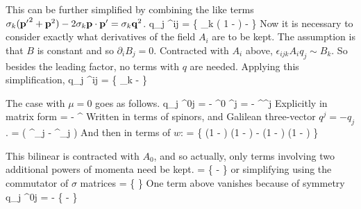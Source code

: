 This can be further simplified by combining the like terms $\sigma_k (\mathbf{p'}^2 + \mathbf{p}^2 ) - 2 \sigma_k \mathbf{p} \cdot \mathbf{p'} = \sigma_k \mathbf{q}^2$.
\beq
	\srb  {} q_j \sigma^{ij} \sr 
		=  \wxd \left \{
			\sigma_k \left( 1 -  \right ) -  
		\right \} \wx
\eeq
Now it is necessary to consider exactly what derivatives of the field $A_i$ are to be kept.  The assumption is that $B$ is constant and so $\partial_i B_j = 0$.  Contracted with $A_i$ above, $\epsilon_{ijk} A_i q_j \sim B_k$.  So besides the leading factor, no terms with $q$ are needed.  Applying this simplification,
\beq \label{eq:Sh:Ti}
	\srb  {} q_j \sigma^{ij} \sr 
		=  \wxd \left \{
			\sigma_k -  
		\right \} \wx
\eeq






The case with $\mu=0$ goes as follows.
\beq
	\srb  {} q_j \sigma^{0j} \sr
		=	 -  \srb \gamma^0 \gamma^j \sr 		
 		=  -  \sr^\dagger \gamma^j \sr
\eeq
Explicitly in matrix form 
\beq
	 = -  \sr^\dagger {} \sr 
\eeq
 Written in terms of spinors, and Galilean three-vector $q^j= -q_j$.
 \beq
 	=   \left( \eta^\dagger \sigma_j \chi - \chi^\dagger \sigma_j \eta \right )
 \eeq
 And then in terms of $w$:
\beq
	=    \wxd \left \{
		\left(1 -  \right )   \left(1 -  \right )
		- \left(1 -  \right )  \left(1 -  \right )
	\right \} \wx
\eeq

This bilinear is contracted with $A_0$, and so actually, only terms involving two additional powers of momenta need be kept.
\beq
	=    \wxd \left \{
		-   
	\right \} \wx
\eeq
or simplifying using the commutator of $\sigma$ matrices
\beq 
	=     \wxd \left \{
	\right \} \wx
\eeq
One term above vanishes because of symmetry
\beq \label{eq:Sh:T0}
\srb  {} q_j \sigma^{0j} \sr
	=  -  \wxd \left \{
			-  
	\right \} \wx
\eeq


